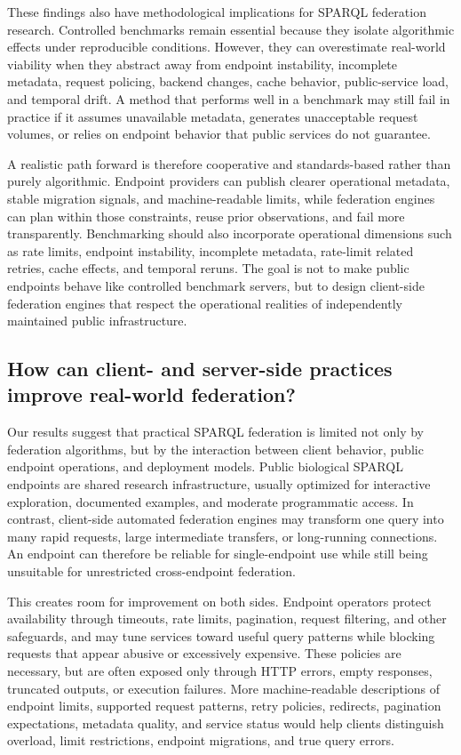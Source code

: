 \documentclass[runningheads]{llncs}
\begin{document}
These findings also have methodological implications for SPARQL federation research. 
Controlled benchmarks remain essential because they isolate algorithmic effects under reproducible conditions. 
However, they can overestimate real-world viability when they abstract away from endpoint instability, incomplete metadata, request policing, backend changes, cache behavior, public-service load, and temporal drift. 
A method that performs well in a benchmark may still fail in practice if it assumes unavailable metadata, generates unacceptable request volumes, or relies on endpoint behavior that public services do not guarantee.

A realistic path forward is therefore cooperative and standards-based rather than purely algorithmic. 
Endpoint providers can publish clearer operational metadata, stable migration signals, and machine-readable limits, while federation engines can plan within those constraints, reuse prior observations, and fail more transparently. 
Benchmarking should also incorporate operational dimensions such as rate limits, endpoint instability, incomplete metadata, rate-limit related retries, cache effects, and temporal reruns. 
The goal is not to make public endpoints behave like controlled benchmark servers, but to design client-side federation engines that respect the operational realities of independently maintained public infrastructure.


\subsection{How can client- and server-side practices improve real-world federation?}

Our results suggest that practical SPARQL federation is limited not only by federation algorithms, but by the interaction between client behavior, public endpoint operations, and deployment models. 
Public biological SPARQL endpoints are shared research infrastructure, usually optimized for interactive exploration, documented examples, and moderate programmatic access. 
In contrast, client-side automated federation engines may transform one query into many rapid requests, large intermediate transfers, or long-running connections. 
An endpoint can therefore be reliable for single-endpoint use while still being unsuitable for unrestricted cross-endpoint federation.

This creates room for improvement on both sides. 
Endpoint operators protect availability through timeouts, rate limits, pagination, request filtering, and other safeguards, and may tune services toward useful query patterns while blocking requests that appear abusive or excessively expensive. 
These policies are necessary, but are often exposed only through HTTP errors, empty responses, truncated outputs, or execution failures. 
More machine-readable descriptions of endpoint limits, supported request patterns, retry policies, redirects, pagination expectations, metadata quality, and service status would help clients distinguish overload, limit restrictions, endpoint migrations, and true query errors.
\end{document}
